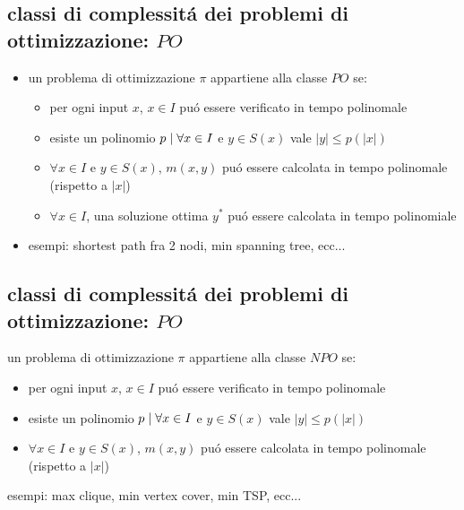 
\subsection*{classi di complessit\'a dei problemi di ottimizzazione: $PO$}
\begin{flushleft}
	\begin{itemize}
		\item un problema di ottimizzazione $\pi$ appartiene alla classe $PO$ se:
		\begin{itemize}
			\item per ogni input $x$, $x\in I$ pu\'o essere verificato in tempo polinomale
			\item esiste un polinomio $p\hspace{0.1cm}\vert\hspace{0.1cm}\forall x\in I$ e $y\in S(x)$ vale $|y|\leq p(|x|)$ 
			\item $\forall x\in I$ e $y\in S(x)$, $m(x,y)$ pu\'o essere calcolata in tempo polinomale (rispetto a $|x|$) 
			\item $\forall x\in I$, una soluzione ottima $y^*$ pu\'o essere calcolata in tempo polinomiale
		\end{itemize}
		\item esempi: shortest path fra 2 nodi, min spanning tree, ecc...
	\end{itemize}
\end{flushleft}


\subsection*{classi di complessit\'a dei problemi di ottimizzazione: $PO$}
\begin{flushleft}
		\item un problema di ottimizzazione $\pi$ appartiene alla classe $NPO$ se:
		\begin{itemize}
			\item per ogni input $x$, $x\in I$ pu\'o essere verificato in tempo polinomale
			\item esiste un polinomio $p\hspace{0.1cm}\vert\hspace{0.1cm}\forall x\in I$ e $y\in S(x)$ vale $|y|\leq p(|x|)$ 
			\item $\forall x\in I$ e $y\in S(x)$, $m(x,y)$ pu\'o essere calcolata in tempo polinomale (rispetto a $|x|$) 
		\end{itemize}
		\item esempi: max clique, min vertex cover, min TSP, ecc...
\end{flushleft}

